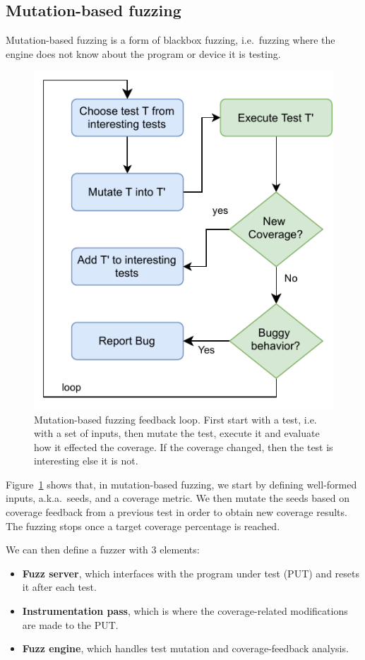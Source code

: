 \documentclass[conference]{IEEEtran}
\newcommand{\todo}[1]{{\color{olive} TODO: #1}}
\begin{document}
\subsection{Mutation-based fuzzing}
Mutation-based fuzzing is a form of blackbox fuzzing, i.e.\ fuzzing where the engine does not know about the program or device it is testing.
\begin{figure}
  \centering
    \includegraphics[width=0.9\linewidth]{mutation-fuzzing.pdf}
    \caption{Mutation-based fuzzing feedback loop. First start with a test, i.e.\, with a set of inputs, then mutate the test, execute it and evaluate how it effected the coverage. If the coverage changed, then the test is interesting else it is not.}
\label{fig:mut-fuzz}
\end{figure}

Figure~\ref{fig:mut-fuzz} shows that, in mutation-based fuzzing, we start by defining well-formed inputs, a.k.a.\ seeds, and a coverage metric. 
We then mutate the seeds based on coverage feedback from a previous test in order to obtain new coverage results. 
The fuzzing stops once a target coverage percentage is reached.

We can then define a fuzzer with 3 elements:
\begin{itemize}
\item \textbf{Fuzz server}, which interfaces with the program under test (PUT) and resets it after each test.
\item \textbf{Instrumentation pass}, which is where the coverage-related modifications are made to the PUT.
\item \textbf{Fuzz engine}, which handles test mutation and coverage-feedback analysis.
\end{itemize}
\end{document}
